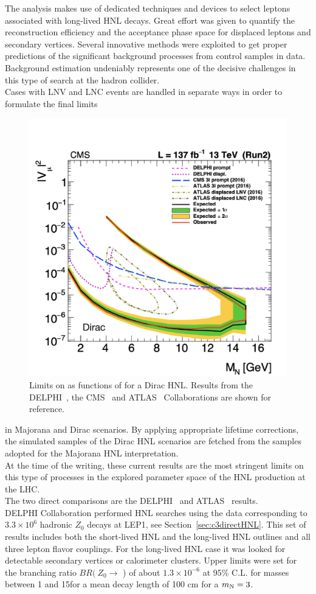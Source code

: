 The analysis makes use of dedicated techniques and devices to select
leptons associated with long-lived HNL decays. Great effort was given
to quantify the reconstruction efficiency and the acceptance phase space
for displaced leptons and secondary vertices. Several innovative
methods were exploited to get proper predictions
of the significant background processes from control samples in
data. Background estimation undeniably represents one of the decisive challenges in this
type of search at the hadron collider.\\
Cases with LNV and LNC events are handled in separate ways in order to
formulate the final limits
 \begin{figure}
\centering
    \includegraphics[clip,trim=0.3cm 0cm 1.cm 2cm, width=.48\textwidth]{Figures/c6/results/dirac_mu_with_ATLAS.pdf}
\caption{ Limits on \mixparm as
        functions of \mhnl for a Dirac HNL. Results from the
        DELPHI~\cite{Abreu:1996pa}, the CMS~\cite{Sirunyan:2018mtv}
        and ATLAS~\cite{atlas_ll} Collaborations are shown for reference.}
\label{fig:atlas}
\end{figure}
 in Majorana and Dirac scenarios. By
applying appropriate lifetime corrections, the simulated samples of
the Dirac HNL scenarios are fetched from the samples adopted for the
Majorana HNL interpretation.\\


At the time of the writing, these current results are the most
stringent limits on this type of processes in the
explored parameter space of the HNL production at the LHC. \\
The two direct comparisons are the DELPHI~\cite{Abreu:1996pa} and
ATLAS~\cite{atlas_ll} results. \\
DELPHI Collaboration performed HNL searches 
  using the data corresponding to $3.3
  \times 10^6$ hadronic $Z_0$ decays at LEP1, see Section~\ref{sec:c3directHNL}. This set of results 
  includes both the short-lived HNL
 and the long-lived HNL outlines and all three lepton flavor
 couplings. For the long-lived HNL case it was looked for detectable secondary vertices or calorimeter clusters.
 Upper limits were set for the branching ratio $BR (\: Z_0\rightarrow$ \hnl) of
 about $1.3 \times 10^{-6}$ at 95\% C.L. for \hnl masses between 1 and
 15\GeV for a mean decay length of 100 cm for a $m_\mathrm{N} = 3$\GeV.

